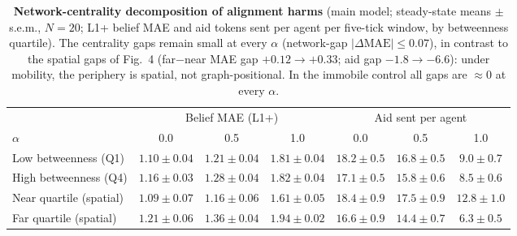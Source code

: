 \documentclass[11pt]{article}
\begin{document}
\begin{table}[h!]
\centering
\caption{\textbf{Network-centrality decomposition of alignment harms}
(main model; steady-state means $\pm$ s.e.m., $N = 20$; L1+ belief MAE
and aid tokens sent per agent per five-tick window, by betweenness
quartile). The centrality gaps remain small at every $\alpha$
(network-gap $|\Delta\mathrm{MAE}| \leq 0.07$), in contrast to the
spatial gaps of Fig.~4 (far$-$near MAE gap $+0.12 \to +0.33$; aid gap
$-1.8 \to -6.6$): under mobility, the periphery is spatial, not
graph-positional. In the immobile control all gaps are $\approx 0$ at
every $\alpha$.}\label{tab:s3-centrality}
\small
\begin{tabular}{@{}lcccccc@{}}
\toprule
 & \multicolumn{3}{c}{Belief MAE (L1+)} & \multicolumn{3}{c}{Aid sent per agent} \\
\cmidrule(lr){2-4}\cmidrule(lr){5-7}
$\alpha$ & 0.0 & 0.5 & 1.0 & 0.0 & 0.5 & 1.0 \\
\midrule
Low betweenness (Q1)  & $1.10 \pm 0.04$ & $1.21 \pm 0.04$ & $1.81 \pm 0.04$ & $18.2 \pm 0.5$ & $16.8 \pm 0.5$ & $9.0 \pm 0.7$ \\
High betweenness (Q4) & $1.16 \pm 0.03$ & $1.28 \pm 0.04$ & $1.82 \pm 0.04$ & $17.1 \pm 0.5$ & $15.8 \pm 0.6$ & $8.5 \pm 0.6$ \\
\midrule
Near quartile (spatial) & $1.09 \pm 0.07$ & $1.16 \pm 0.06$ & $1.61 \pm 0.05$ & $18.4 \pm 0.9$ & $17.5 \pm 0.9$ & $12.8 \pm 1.0$ \\
Far quartile (spatial)  & $1.21 \pm 0.06$ & $1.36 \pm 0.04$ & $1.94 \pm 0.02$ & $16.6 \pm 0.9$ & $14.4 \pm 0.7$ & $6.3 \pm 0.5$ \\
\bottomrule
\end{tabular}
\end{table}
\end{document}
